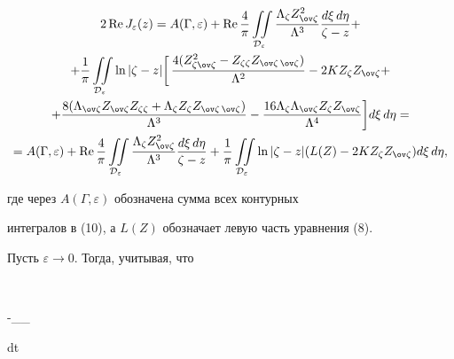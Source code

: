 \begin{multline} 


2\re J_\varepsilon(z)=A(\Gamma,\varepsilon)+\re\frac{4}{\pi} 


\iintl_{\cal D_\varepsilon} 


\frac{\Lambda_\zeta Z^2_{\ov\zeta}}{\Lambda^3} 


\frac{d\xi\,d\eta}{\zeta-z}+\\ 


% 


+\frac{1}{\pi}\iintl_{\cal D_\varepsilon}\ln|\zeta-z|\biggl[\, 


\frac{4(Z^2_{\zeta\ov\zeta}-Z_{\zeta\zeta}Z_{\ov\zeta\,\ov\zeta})} 


{\Lambda^2}-2KZ_\zeta Z_{\ov\zeta}+\\ 


% 


+\frac{8(\Lambda_{\ov\zeta}Z_{\ov\zeta}Z_{\zeta\zeta}+ 


\Lambda_\zeta Z_\zeta Z_{\ov\zeta\,\ov\zeta})} 


{\Lambda^3}- 


\frac{16\Lambda_\zeta\Lambda_{\ov\zeta}Z_\zeta Z_{\ov\zeta}}{\Lambda^4} 


\biggr]d\xi\,d\eta=\\ 


% 


=A(\Gamma,\varepsilon)+\re\frac{4}{\pi} 


\iintl_{\cal D_\varepsilon} 


\frac{\Lambda_\zeta Z^2_{\ov\zeta}}{\Lambda^3} 


\frac{d\xi\,d\eta}{\zeta-z}+\frac{1}{\pi} 


\iintl_{\cal D_\varepsilon}\ln|\zeta-z|(L(Z)- 


2KZ_\zeta Z_{\ov\zeta})d\xi\,d\eta, 


\end{multline} 


где через $A(\Gamma,\varepsilon)$ обозначена сумма всех контурных 


интегралов в (10), а $L(Z)$ обозначает левую часть уравнения (8). 


 


Пусть $\varepsilon\to 0$. Тогда, учитывая, что 


$$


-\ointl_{\Gamma_\varepsilon} 


d\Bar t 


